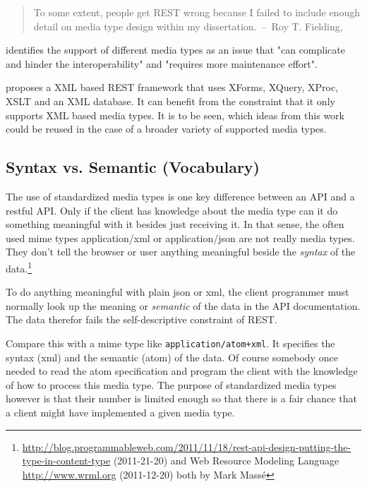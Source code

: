\documentclass[12pt,a4paper,twoside]{scrartcl}		%
\newcommand{\citeurl}[2]{\url{#1} (#2)}
\begin{document}

\begin{quote}
  To some extent, people get REST wrong because I failed to include enough
  detail on media type design within my dissertation.~--~Roy T. Fielding, \cite{Fielding2008}
\end{quote}

\cite[sec. 7.2]{Pautasso:2008:RWS:1367497.1367606} identifies the support of different media types as an issue that "can complicate and hinder the interoperability" and "requires more maintenance effort".

\cite{Davis:2011:XTR:1967428.1967437} proposes a XML based REST framework that uses XForms, XQuery, XProc, XSLT and an XML database. It can benefit from the constraint that it only supports XML based media types. It is to be seen, which ideas from this work could be reused in the case of a broader variety of supported media types.

\subsection{Syntax vs. Semantic (Vocabulary)}

The use of standardized media types is one key difference between an API and a
restful API\cite[sec. 5.2.1.2]{Fielding2000}. Only if the client has knowledge
about the media type can it do something meaningful with it besides just
receiving it. In that sense, the often used mime types application/xml or
application/json are not really media types. They don't tell the browser or user
anything meaningful beside the \emph{syntax} of the data.\footnote{
\citeurl{http://blog.programmableweb.com/2011/11/18/rest-api-design-putting-the-type-in-content-type}{2011-21-20}
and Web Resource Modeling Language \citeurl{http://www.wrml.org}{2011-12-20} both by Mark Massé
}

To do anything meaningful with plain json or xml, the client programmer must
normally look up the meaning or \emph{semantic} of the data in the API
documentation. The data therefor fails the self-descriptive constraint of
REST.

Compare this with a mime type like \texttt{application/atom+xml}. It specifies
the syntax (xml) and the semantic (atom) of the data. Of course somebody once
needed to read the atom specification and program the client with the knowledge
of how to process this media type. The purpose of standardized media types
however is that their number is limited enough so that there is a fair chance
that a client might have implemented a given media type.
\end{document}
